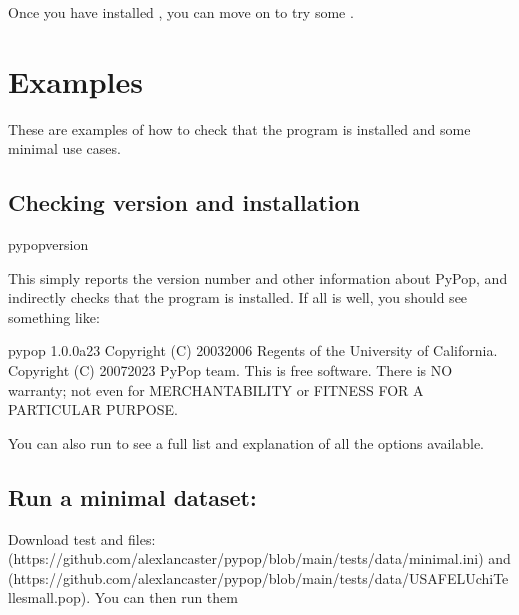 \documentclass[letterpaper,10pt,english,openany,oneside]{sphinxmanual}
\begin{document}
\sphinxAtStartPar
{} {\hyperref[\detokenize{docs/guide-chapter-install:detailed-installation-instructions}]{}} 

\sphinxAtStartPar
Once you have installed , you can move on to try some
{\hyperref[\detokenize{docs/guide-chapter-install:examples}]{}}.


\section{Examples}
\label{\detokenize{docs/guide-chapter-install:examples}}\label{\detokenize{docs/guide-chapter-install:guide-readme-examples}}
\sphinxAtStartPar
These are examples of how to check that the program is installed and
some minimal use cases.


\subsection{Checking version and installation}
\label{\detokenize{docs/guide-chapter-install:checking-version-and-installation}}
\begin{sphinxVerbatim}[commandchars=\\\{\}]
pypop\PYGZhy{}\PYGZhy{}version
\end{sphinxVerbatim}

\sphinxAtStartPar
This simply reports the version number and other information about
PyPop, and indirectly checks that the program is installed. If all is
well, you should see something like:

\begin{sphinxVerbatim}[commandchars=\\\{\}]
pypop 1.0.0a23
Copyright (C) 2003\PYGZhy{}2006 Regents of the University of California.
Copyright (C) 2007\PYGZhy{}2023 PyPop team.
This is free software.  There is NO warranty; not even for
MERCHANTABILITY or FITNESS FOR A PARTICULAR PURPOSE.
\end{sphinxVerbatim}

\sphinxAtStartPar
You can also run  to see a full list and explanation
of all the options available.


\subsection{Run a minimal dataset:}
\label{\detokenize{docs/guide-chapter-install:run-a-minimal-dataset}}
\sphinxAtStartPar
Download test  and  files:  (https://github.com/alexlancaster/pypop/blob/main/tests/data/minimal.ini)
and  (https://github.com/alexlancaster/pypop/blob/main/tests/data/USAFEL\sphinxhyphen{}UchiTelle\sphinxhyphen{}small.pop).
You can then run them
\end{document}
